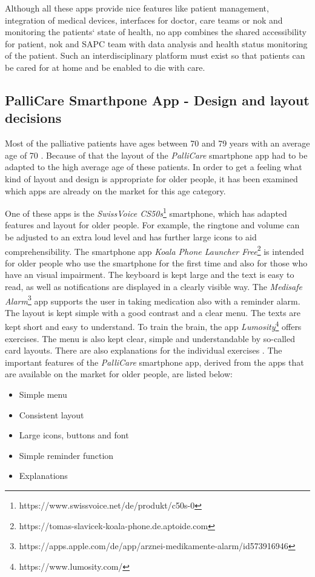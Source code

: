 Although all these apps provide nice features like patient management, integration of medical devices, interfaces for doctor, care teams or nok and monitoring the patients‘ state of health, no app combines the shared accessibility for patient, nok and SAPC team with data analysis and health status monitoring of the patient. Such an interdisciplinary platform must exist so that patients can be cared for at home and be enabled to die with care.

\subsection{PalliCare Smarthpone App - Design and layout decisions}
Most of the palliative patients have ages between 70 and 79 years with an average age of 70 \cite{rki1}. Because of that the layout of the \textit{PalliCare} smartphone app had to be adapted to the high average age of these patients. In order to get a feeling what kind of layout and design is appropriate for older people, it has been examined which apps are already on the market for this age category.   

One of these apps is the \textit{SwissVoice CS50s}\footnote{https://www.swissvoice.net/de/produkt/c50s-0} smartphone, which has adapted features and layout for older people. For example, the ringtone and volume can be adjusted to an extra loud level and has further large icons to aid comprehensibility. The smartphone app \textit{Koala Phone Launcher Free}\footnote{https://tomas-slavicek-koala-phone.de.aptoide.com} is intended for older people who use the smartphone for the first time and also for those who have an visual impairment. The keyboard is kept large and the text is easy to read, as well as notifications are displayed in a clearly visible way. The \textit{Medisafe Alarm}\footnote{https://apps.apple.com/de/app/arznei-medikamente-alarm/id573916946} app supports the user in taking medication also with a reminder alarm. The layout is kept simple with a good contrast and a clear menu. The texts are kept short and easy to understand. To train the brain, the app \textit{Lumosity}\footnote{https://www.lumosity.com/} offers exercises. The menu is also kept clear, simple and understandable by so-called card layouts. There are also explanations for the individual exercises \cite{zabel}.   
\newline \newline The important features of the \textit{PalliCare} smartphone app, derived from the apps that are available on the market for older people, are listed below: 
\begin{itemize}
\item Simple menu
\item Consistent layout 
\item Large icons, buttons and font
\item Simple reminder function
\item Explanations
\end{itemize}

